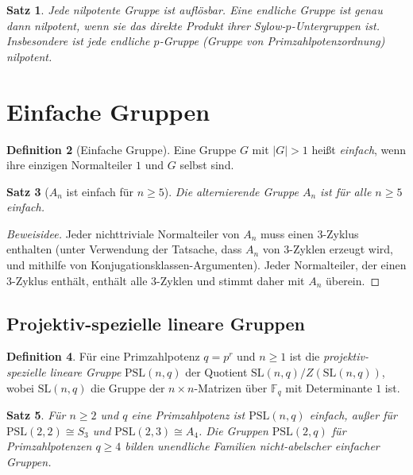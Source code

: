 \documentclass[12pt,a4paper]{amsart}
\newtheorem{theorem}{Satz}[section]
\theoremstyle{definition}
\newtheorem{definition}[theorem]{Definition}
\begin{document}
\begin{theorem}
Jede nilpotente Gruppe ist auflösbar. Eine endliche Gruppe ist genau dann nilpotent,
wenn sie das direkte Produkt ihrer Sylow-$p$-Untergruppen ist. Insbesondere ist jede
endliche $p$-Gruppe (Gruppe von Primzahlpotenzordnung) nilpotent.
\end{theorem}

\section{Einfache Gruppen}
\label{sec:einfach}

\begin{definition}[Einfache Gruppe]
Eine Gruppe $G$ mit $|G| > 1$ heißt \emph{einfach}, wenn ihre einzigen Normalteiler $1$
und $G$ selbst sind.
\end{definition}

\begin{theorem}[$A_n$ ist einfach für $n \geq 5$]
\label{thm:an_einfach}
Die alternierende Gruppe $A_n$ ist für alle $n \geq 5$ einfach.
\end{theorem}

\begin{proof}[Beweisidee]
Jeder nichttriviale Normalteiler von $A_n$ muss einen $3$-Zyklus enthalten
(unter Verwendung der Tatsache, dass $A_n$ von $3$-Zyklen erzeugt wird, und mithilfe
von Konjugationsklassen-Argumenten). Jeder Normalteiler, der einen $3$-Zyklus enthält,
enthält alle $3$-Zyklen und stimmt daher mit $A_n$ überein.
\end{proof}

\subsection{Projektiv-spezielle lineare Gruppen}

\begin{definition}
Für eine Primzahlpotenz $q = p^r$ und $n \geq 1$ ist die \emph{projektiv-spezielle
lineare Gruppe} $\mathrm{PSL}(n, q)$ der Quotient
$\mathrm{SL}(n, q) / Z(\mathrm{SL}(n,q))$, wobei $\mathrm{SL}(n,q)$ die Gruppe der
$n \times n$-Matrizen über $\mathbb{F}_q$ mit Determinante $1$ ist.
\end{definition}

\begin{theorem}
Für $n \geq 2$ und $q$ eine Primzahlpotenz ist $\mathrm{PSL}(n, q)$ einfach, außer für
$\mathrm{PSL}(2, 2) \cong S_3$ und $\mathrm{PSL}(2, 3) \cong A_4$.
Die Gruppen $\mathrm{PSL}(2, q)$ für Primzahlpotenzen $q \geq 4$ bilden unendliche
Familien nicht-abelscher einfacher Gruppen.
\end{theorem}
\end{document}
